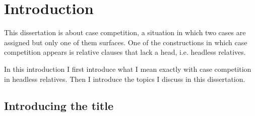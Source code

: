 
\chapter{Introduction}

This dissertation is about case competition, a situation in which two cases are assigned but only one of them surfaces. One of the constructions in which case competition appears is relative clauses that lack a head, i.e. headless relatives.

%

In this introduction I first introduce what I mean exactly with case competition in headless relatives. Then I introduce the topics I discuss in this dissertation.


\section{Introducing the title}


